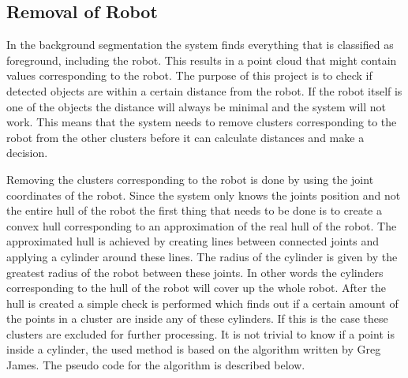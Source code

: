 \subsection{Removal of Robot}

In the background segmentation the system finds everything that is classified as foreground, including the robot. This results in a point cloud that might contain values corresponding to the robot. The purpose of this project is to check if detected objects are within a certain distance from the robot. If the robot itself is one of the objects the distance will always be minimal and the system will not work. This means that the system needs to remove clusters corresponding to the robot from the other clusters before it can calculate distances and make a decision. 

Removing the clusters corresponding to the robot is done by using the joint coordinates of the robot. Since the system only knows the joints position and not the entire hull of the robot the first thing that needs to be done is to create a convex hull corresponding to an approximation of the real hull of the robot. The approximated hull is achieved by creating lines between connected joints and applying a cylinder around these lines. The radius of the cylinder is given by the greatest radius of the robot between these joints. In other words the cylinders corresponding to the hull of the robot will cover up the whole robot. After the hull is created a simple check is performed which finds out if a certain amount of the points in a cluster are inside any of these cylinders. If this is the case these clusters are excluded for further processing. It is not trivial to know if a point is inside a cylinder, the used method is based on the algorithm written by Greg James. \cite{cylinder} The pseudo code for the algorithm is described below.


